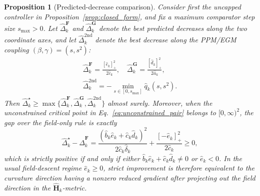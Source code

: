 \documentclass[journal]{IEEEtran}
\newtheorem{proposition}{Proposition}
\theoremstyle{remark}
\newcommand{\bH}{\boldsymbol{H}}
\newcommand{\bF}{\boldsymbol{F}}
\newcommand{\bG}{\boldsymbol{G}}
\begin{document}
	\begin{proposition}[Predicted-decrease comparison]\label{prop:dominance}
		Consider first the uncapped controller in Proposition~\ref{prop:closed_form}, and fix a maximum comparator step size $s_{\max}>0$.
		Let $\widehat\Delta_k^{\bF}$ and $\widehat\Delta_k^{\bG}$ denote the best predicted decreases along the two coordinate axes, and let $\widehat\Delta_k^{\mathrm{2nd}}$ denote the best decrease along the PPM/EGM coupling $(\beta,\gamma)=(s,s^2)$:
		\[
		\begin{gathered}
			\widehat\Delta_{k}^{\bF}=\frac{[\hat e_k]_+^2}{2\hat c_k},
			\quad
			\widehat\Delta_{k}^{\bG}=\frac{[\hat d_k]_+^2}{2\hat a_k},\\
			\widehat\Delta_{k}^{\mathrm{2nd}}=-\min_{s\in[0,s_{\max}]}\hat q_k(s,s^2).
		\end{gathered}
		\]
		Then $\widehat\Delta_{k}^{\star}\ge\max\{\widehat\Delta_{k}^{\bF},\widehat\Delta_{k}^{\bG},\widehat\Delta_{k}^{\mathrm{2nd}}\}$ almost surely.
		Moreover, when the unconstrained critical point in Eq.~\eqref{eq:unconstrained_pair} belongs to $[0,\infty)^2$, the gap over the field-only rule is exactly
		\begin{equation}\label{eq:dominance_gap}
			\widehat\Delta_{k}^{\star}-\widehat\Delta_{k}^{\bF}
			=
			\frac{(\hat b_{k}\hat e_{k}+\hat c_{k}\hat d_{k})^{2}}{2\hat c_{k}\hat\delta_{k}}
			+\frac{[-\hat e_k]_{+}^{2}}{2\hat c_k}
			\ge 0,
		\end{equation}
		which is strictly positive if and only if either $\hat b_{k}\hat e_{k}+\hat c_{k}\hat d_{k}\neq 0$ or $\hat e_k<0$.
		In the usual field-descent regime $\hat e_k\ge0$, strict improvement is therefore equivalent to the curvature direction having a nonzero reduced gradient after projecting out the field direction in the $\widehat{\bH}_{k}$-metric.
	\end{proposition}
	
\end{document}
